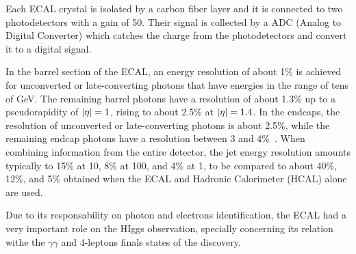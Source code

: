 Each ECAL crystal is isolated by a carbon fiber layer and it is connected to two photodetectors with a gain of 50. Their signal is collected by a ADC (Analog to Digital Converter) which catches the charge from the photodetectors and convert it to a digital signal.

In the barrel section of the ECAL, an energy resolution of about 1\% is achieved for unconverted or late-converting photons that have energies in the range of tens of GeV. The remaining barrel photons have a resolution of about 1.3\% up to a pseudorapidity of $\lvert \eta \rvert = 1$, rising to about 2.5\% at $\lvert \eta \rvert = 1.4$. In the endcaps, the resolution of unconverted or late-converting photons is about 2.5\%, while the remaining endcap photons have a resolution between 3 and 4\%~\cite{CMS:EGM-14-001}. When combining information from the entire detector, the jet energy resolution amounts typically to 15\% at 10\GeV, 8\% at 100\GeV, and 4\% at 1\TeV, to be compared to about 40\%, 12\%, and 5\% obtained when the ECAL and Hadronic Calorimeter (HCAL) alone are used. 

Due to its responsability on photon and electrons identification, the ECAL had a very important role on the HIggs observation, specially concerning its relation withe the $\gamma\gamma$ and 4-leptons finals states of the discovery.



